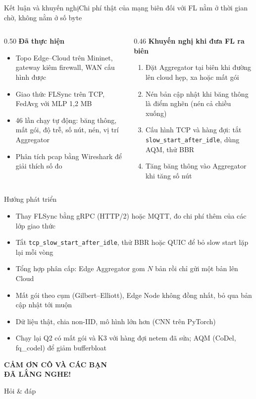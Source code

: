 \documentclass[aspectratio=169,10pt]{beamer}
\begin{document}
\begin{frame}{Kết luận và khuyến nghị}{Chi phí thật của mạng biên đối với FL nằm ở thời gian chờ, không nằm ở số byte}
  \begin{columns}[T]
    \begin{column}{0.50\textwidth}
      \textbf{Đã thực hiện}
      \begin{itemize}\small
        \item Topo Edge--Cloud trên Mininet, gateway kiêm firewall, WAN cấu hình được
        \item Giao thức FLSync trên TCP, FedAvg với MLP 1,2 MB
        \item 46 lần chạy tự động: băng thông, mất gói, độ trễ, số nút, nén, vị trí Aggregator
        \item Phân tích pcap bằng Wireshark để giải thích số đo
      \end{itemize}
    \end{column}
    \begin{column}{0.46\textwidth}
      \textbf{Khuyến nghị khi đưa FL ra biên}
      \begin{enumerate}\small
        \item Đặt Aggregator tại biên khi đường lên cloud hẹp, xa hoặc mất gói
        \item Nén bản cập nhật khi băng thông là điểm nghẽn (nén cả chiều xuống)
        \item Cấu hình TCP và hàng đợi: tắt \texttt{slow\_start\_after\_idle}, dùng AQM, thử BBR
        \item Tăng băng thông vào Aggregator khi tăng số nút
      \end{enumerate}
    \end{column}
  \end{columns}
\end{frame}

\begin{frame}{Hướng phát triển}{}
  \begin{itemize}
    \item Thay FLSync bằng gRPC (HTTP/2) hoặc MQTT, đo chi phí thêm của các lớp giao thức
    \item Tắt \texttt{tcp\_slow\_start\_after\_idle}, thử BBR hoặc QUIC để bỏ slow start lặp lại mỗi vòng
    \item Tổng hợp phân cấp: Edge Aggregator gom $N$ bản rồi chỉ gửi một bản lên Cloud
    \item Mất gói theo cụm (Gilbert--Elliott), Edge Node không đồng nhất, bỏ qua bản cập nhật tới muộn
    \item Dữ liệu thật, chia non-IID, mô hình lớn hơn (CNN trên PyTorch)
    \item Chạy lại Q2 có mất gói và K3 với hàng đợi netem đã sửa; AQM (CoDel, fq\_codel) để giảm bufferbloat
  \end{itemize}
\end{frame}

\begin{hustreferencesframe}[from=1, to=8]
\end{hustreferencesframe}


\begin{hustdarkframe}
  \centering
  \vspace*{0.2\paperheight}
  {\Huge\bfseries\color{white} CẢM ƠN CÔ VÀ CÁC BẠN\\ĐÃ LẮNG NGHE!\par}
  \vspace{1.5em}
  {\large\color{white!85} Hỏi \& đáp\par}
\end{hustdarkframe}
\end{document}
